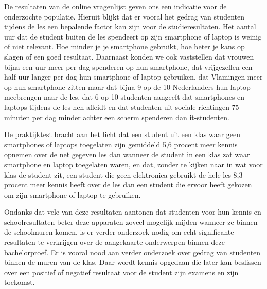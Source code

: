 De resultaten van de online vragenlijst geven ons een indicatie voor de onderzochte populatie. Hieruit blijkt dat er vooral het gedrag van studenten tijdens de les een bepalende factor kan zijn voor de studieresultaten. Het aantal uur dat de student buiten de les spendeert op zijn smartphone of laptop is weinig of niet relevant. Hoe minder je je smartphone gebruikt, hoe beter je kans op slagen of een goed resultaat. Daarnaast konden we ook vaststellen dat vrouwen bijna een uur meer per dag spenderen op hun smartphone, dat vrijgezellen een half uur langer per dag hun smartphone of laptop gebruiken, dat Vlamingen meer op hun smartphone zitten maar dat bijna 9 op de 10 Nederlanders hun laptop meebrengen naar de les, dat 6 op 10 studenten aangeeft dat smartphones en laptops tijdens de les hen afleidt en dat studenten uit sociale richtingen 75 minuten per dag minder achter een scherm spenderen dan it-studenten.

De praktijktest bracht aan het licht dat een student uit een klas waar geen smartphones of laptops toegelaten zijn gemiddeld 5,6 procent meer kennis opnemen over de net gegeven les dan wanneer de student in een klas zat waar smartphone en laptop toegelaten waren, en dat, zonder te kijken naar in wat voor klas de student zit, een student die geen elektronica gebruikt de hele les 8,3 procent meer kennis heeft over de les dan een student die ervoor heeft gekozen om zijn smartphone of laptop te gebruiken.

Ondanks dat vele van deze resultaten aantonen dat studenten voor hun kennis en schoolresultaten beter deze apparaten zoveel mogelijk mijden wanneer ze binnen de schoolmuren komen, is er verder onderzoek nodig om echt significante resultaten te verkrijgen over de aangekaarte onderwerpen binnen deze bachelorproef. Er is vooral nood aan verder onderzoek over gedrag van studenten binnen de muren van de klas. Daar wordt kennis opgedaan die later kan beslissen over een positief of negatief resultaat voor de student zijn examens en zijn toekomst. 
